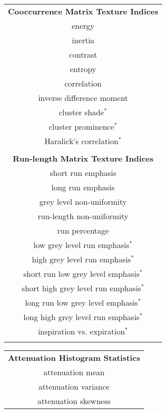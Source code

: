 \begin{table}[!t]
\begin{minipage}{0.33 \linewidth}
    \centering
    \begin{tabular}[t]{c}
    {\bf Cooccurrence Matrix Texture Indices}  \\
    \cmidrule[1pt](lr){1-1}
    energy  \\
    inertia  \\
    contrast  \\
    entropy  \\
    correlation  \\
    inverse difference moment \\
    cluster shade$^*$ \\
    cluster prominence$^*$ \\
    Haralick's correlation$^*$ \\
    \\
    {\bf Run-length Matrix Texture Indices}  {} \\
    \cmidrule[1pt](lr){1-1}
    short run emphasis  \\
    long run emphasis   \\
    grey level non-uniformity   \\
    run-length non-uniformity  \\
    run percentage  \\
    low grey level run emphasis$^*$ \\
    high grey level run emphasis$^*$ \\
    short run low grey level emphasis$^*$ \\
    short high grey level run emphasis$^*$ \\
    long run low grey level emphasis$^*$ \\
    long high grey level run emphasis$^*$ \\
    inspiration vs. expiration$^*$\\
    \\
    \end{tabular}
   \end{minipage}
  \hspace{0cm}
  \begin{minipage}{0.33 \linewidth}
   \vspace{0mm}
    \centering
    \begin{tabular}[t]{c}
    {\bf Attenuation Histogram Statistics}  \\
    \cmidrule[1pt](lr){1-1}
    attenuation mean  \\
    attenuation variance  \\
    attenuation skewness  \\

\end{tabular}
\end{minipage}
\end{table}
